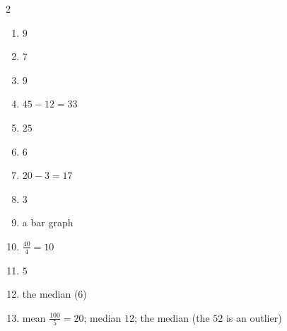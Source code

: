 \documentclass[11pt]{article}
\begin{document}
\begin{keybox}
\begin{multicols}{2}
\small
\begin{enumerate}[leftmargin=*,itemsep=3pt]
  \item $9$
  \item $7$
  \item $9$
  \item $45-12=33$
  \item $25$
  \item $6$
  \item $20-3=17$
  \item $3$
  \item a bar graph
  \item $\tfrac{40}{4}=10$
  \item $5$
  \item the median ($6$)
  \item mean $\tfrac{100}{5}=20$; median $12$; the median (the $52$ is an outlier)
\end{enumerate}
\end{multicols}
\end{keybox}
\end{document}
